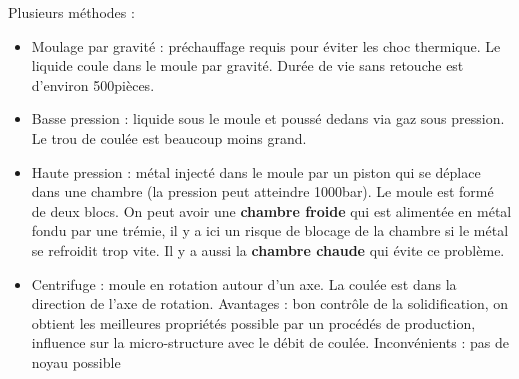 \documentclass[../main.tex]{subfiles}
\begin{document}
Plusieurs méthodes :\\
\begin{itemize}
    \item Moulage par gravité : préchauffage requis pour éviter les choc thermique. Le liquide coule dans le moule par gravité. Durée de vie sans retouche est d'environ 500pièces.\\
    \item Basse pression : liquide sous le moule et poussé dedans via gaz sous pression. Le trou de coulée est beaucoup moins grand.\\
    \item Haute pression : métal injecté dans le moule par un piston qui se déplace dans une chambre (la pression peut atteindre 1000bar). Le moule est formé de deux blocs. On peut avoir une \textbf{chambre froide} qui est alimentée en métal fondu par une trémie, il y a ici un risque de blocage de la chambre si le métal se refroidit trop vite. Il y a aussi la \textbf{chambre chaude} qui évite ce problème.\\
    \item Centrifuge : moule en rotation autour d'un axe. La coulée est dans la direction de l'axe de rotation. Avantages : bon contrôle de la solidification, on obtient les meilleures propriétés possible par un procédés de production, influence sur la micro-structure avec le débit de coulée. Inconvénients : pas de noyau possible\\
\end{itemize}
\end{document}

